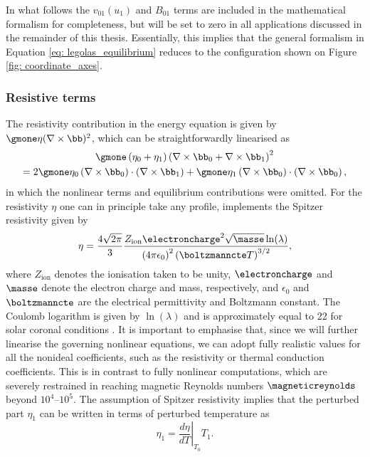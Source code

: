In what follows the $v_{01}(u_1)$ and $B_{01}$ terms are included in the mathematical formalism for completeness, but will be set to zero in all applications discussed in the remainder of this thesis. Essentially, this implies that the general formalism in Equation \eqref{eq: legolas_equilibrium} reduces to the configuration shown on Figure \ref{fig: coordinate_axes}.

\subsubsection{Resistive terms}
The resistivity contribution in the energy equation is given by $\gmone \eta (\nabla \times \bb)^2$, which can be straightforwardly linearised as
\begin{equation}
  \begin{gathered}
    \gmone\left(\eta_0 + \eta_1\right)\left(\nabla \times \bb_0 + \nabla \times \bb_1\right)^2 \\
    = 2\gmone \eta_0 \left(\nabla \times \bb_0\right) \cdot \left(\nabla \times \bb_1\right)
      + \gmone\eta_1 \left(\nabla \times \bb_0\right) \cdot \left(\nabla \times \bb_0\right),
  \end{gathered}
\end{equation}
in which the nonlinear terms and equilibrium contributions were omitted. For the resistivity $\eta$ one can in principle take any profile, {\legolas} implements the Spitzer resistivity given by
\begin{equation} \label{eq: spitzer_eta}
  \eta = \frac{4\sqrt{2\pi}}{3}\frac{
    Z_\text{ion} \electroncharge^2 \sqrt{\masse} \ln(\lambda)
  }{
    \left(4\pi\epsilon_0\right)^2\left(\boltzmanncte T\right)^{3/2}
  },
\end{equation}
where $Z_\text{ion}$ denotes the ionisation taken to be unity, $\electroncharge$ and $\masse$ denote the electron charge and mass, respectively, and $\epsilon_0$ and $\boltzmanncte$ are the electrical permittivity and Boltzmann constant. The Coulomb logarithm is given by $\ln(\lambda)$ and is approximately equal to 22 for solar coronal conditions \citep{book_MHD}. It is important to emphasise that, since we will further linearise the governing nonlinear equations, we can adopt fully realistic values for all the nonideal coefficients, such as the resistivity or thermal conduction coefficients. This is in contrast to fully nonlinear computations, which are severely restrained in reaching magnetic Reynolds numbers $\magneticreynolds$ beyond $10^4$--$10^5$. The assumption of Spitzer resistivity implies that the perturbed part $\eta_1$ can be written in terms of perturbed temperature as
\begin{equation}
  \eta_1 = \left.\frac{d\eta}{dT}\right|_{T_0}T_1.
\end{equation}

